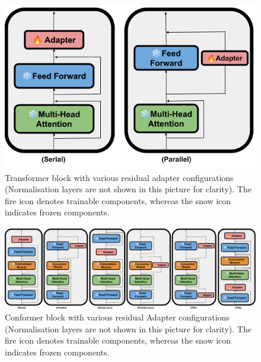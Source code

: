 \begin{figure}[t]
    \begin{center}
    \includegraphics[scale=0.4]{imgs/Adapter_Transformer.png}
    \caption{Transformer block with various residual adapter configurations (Normalisation layers are not shown in this picture for clarity). The fire icon denotes trainable components, whereas the snow icon indicates frozen components.
    }
    \label{fig:transformer_config}
    \end{center}
\end{figure}
\begin{figure}[t]
    \begin{center}
    \includegraphics[scale=0.27]{imgs/Adapter_conformer.png}
    \caption{Conformer block with various residual Adapter configurations  (Normalisation layers are not shown in this picture for clarity). The fire icon denotes trainable components, whereas the snow icon indicates frozen components.
    }
    \label{fig:conformer_config}
    \end{center}
\end{figure}

